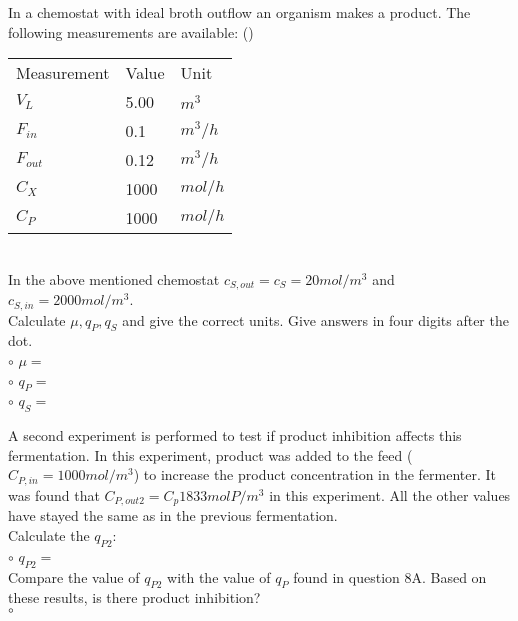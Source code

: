 \documentclass[]{beamer}
\begin{document}
\begin{frame}[shrink] {}
\addtocounter{questions}{1}
\color{blue}
In a chemostat with ideal broth outflow an organism makes a product. The following measurements are available: ()\\
\color{gray}
 \begin{tabular}[ ]{l l l}
Measurement & Value & Unit \\
$V_L$ & 5.00 & $m^3$ \\
$F_{in}$ & 0.1 & $m^{3}/h$ \\
$F_{out}$ & 0.12 & $m^{3}/h$ \\
$C_{X}$ & 1000 & $mol/h$ \\
$C_{P}$ & 1000 & $mol/h$ \\
 \end{tabular} \\
\color{black}
In the above mentioned chemostat $c_{S,out} = c_{S} =20mol/m^3$ and $c_{S,in} = 2000 mol/m^3$. \\[0.3em]
Calculate $\mu, q_P, q_S$ and give the correct units. Give answers in four digits after the dot. \\
\setlength{\parindent}{-0.4cm}
{\color{red}$\circ$} $\mu=$\\ 
{\color{red}$\circ$} $q_P=$ \\ 
{\color{red}$\circ$} $q_S=$ \\
\end{frame}

\begin{frame}[shrink] {}
  A second experiment is performed to test if product inhibition affects this fermentation. In this experiment, product was added to the feed ($C_{P,in} = 1000 mol/m^3$) to increase the product concentration in the fermenter. It was found that $C_{P,out2} =C_p  1833 mol P/m^3$ in this experiment. All the other values have stayed the same as in the previous fermentation. \\[0.3em]
  Calculate the $q_{P2}$: \\ [0.3em]
{\color{red}$\circ$} $q_{P2}=$\\[0.5em] 
Compare the value of $q_{P2}$ with the value of $q_{P}$ found in question 8A. Based on these results, is there product inhibition? \\[0.3em]
{\color{red}$\circ$} \\ 
\end{frame}

\end{document}
